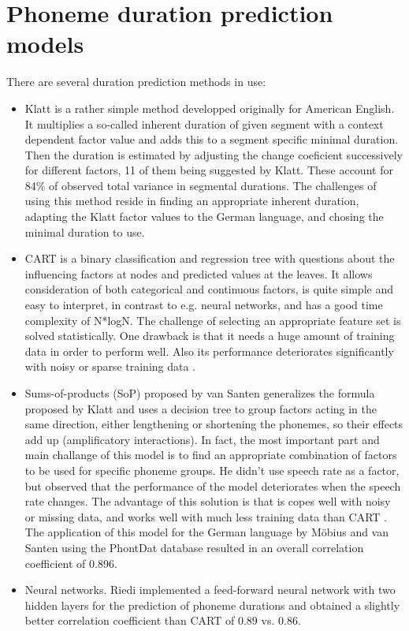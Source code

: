 \documentclass[a4paper]{scrreprt}
\begin{document}
\chapter{Phoneme duration prediction models}
There are several duration prediction methods in use: 
\begin{itemize}
	\item Klatt \cite{Klatt1979} is a rather simple method developped originally for American English. It multiplies a so-called inherent duration of given segment with a context dependent factor value and adds this to a segment specific minimal duration. Then the duration is estimated by adjusting the change coeficient successively for different factors, 11 of them being suggested by Klatt. These account for 84\% of observed total variance in segmental durations. The challenges of using this method reside in finding an appropriate inherent duration, adapting the Klatt factor values to the German language, and chosing the minimal duration to use.
	\item CART \cite{Riley1992} is a binary classification and regression tree with questions about the influencing factors at nodes and predicted values at the leaves. It allows consideration of both categorical and continuous factors, is quite simple and easy to interpret, in contrast to e.g. neural networks, and has a good time complexity of N*logN. The challenge of selecting an appropriate feature set is solved statistically. One drawback is that it needs a huge amount of training data in order to perform well. Also its performance deteriorates significantly with noisy or sparse training data \cite{Moebius1996}.
	\item Sums-of-products (SoP) proposed by van Santen \cite{Santen1994} generalizes the formula proposed by Klatt and uses a decision tree to group factors acting in the same direction, either lengthening or shortening the phonemes, so their effects add up (amplificatory interactions). In fact, the most important part and main challange of this model is to find an appropriate combination of factors to be used for specific phoneme groups. He didn't use speech rate as a factor, but observed that the performance of the model deteriorates when the speech rate changes. The advantage of this solution is that is copes well with noisy or missing data, and works well with much less training data than CART \cite{Moebius1996}. The application of this model for the German language by Möbius and van Santen using the PhontDat database resulted in an overall correlation coefficient of 0.896.
	\item Neural networks. Riedi \cite{Riedi1995} implemented a feed-forward neural network with two hidden layers for the prediction of phoneme durations and obtained a slightly better correlation coefficient than CART of 0.89 vs. 0.86.
\end{itemize}
\end{document}
